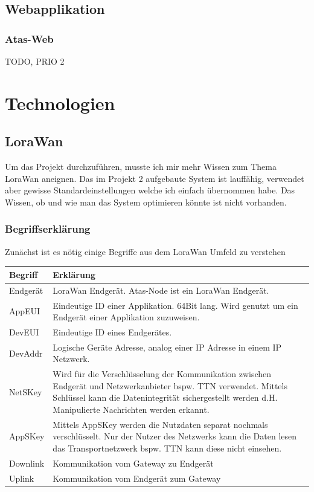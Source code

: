 \documentclass[11pt,english,german]{report}
\theoremstyle{definition}
\begin{document}
\newpage
\section{Webapplikation}
\subsection{Atas-Web}
TODO, PRIO 2

\chapter{Technologien}
\section{LoraWan}
Um das Projekt durchzuführen, musste ich mir mehr Wissen zum Thema LoraWan aneignen. Das im Projekt 2 aufgebaute System ist lauffähig, verwendet aber gewisse Standardeinstellungen welche ich einfach übernommen habe. Das Wissen, ob und wie man das System optimieren könnte ist nicht vorhanden.
\subsection{Begriffserklärung}
Zunächst ist es nötig einige Begriffe aus dem LoraWan Umfeld zu verstehen\\[0.5cm]
\begin{tabularx}{\textwidth}{ l|X }
	\textbf{Begriff} & \textbf{Erklärung} \\ \hline
	Endgerät & LoraWan Endgerät. Atas-Node ist ein LoraWan Endgerät.\\ \hline
	AppEUI& Eindeutige ID einer Applikation. 64Bit lang. Wird genutzt um ein Endgerät einer Applikation zuzuweisen.\\ \hline
	DevEUI& Eindeutige ID eines Endgerätes. \\ \hline
	DevAddr & Logische Geräte Adresse, analog einer IP Adresse in einem IP Netzwerk.\\ \hline
	NetSKey & Wird für die Verschlüsselung der Kommunikation zwischen Endgerät und Netzwerkanbieter bspw. TTN verwendet. Mittels Schlüssel kann die Datenintegrität sichergestellt werden d.H. Manipulierte Nachrichten werden erkannt.\\ \hline
	AppSKey & Mittels AppSKey werden die Nutzdaten separat nochmals verschlüsselt. Nur der Nutzer des Netzwerks kann die Daten lesen das Transportnetzwerk bspw. TTN kann diese nicht einsehen.\cite{ttnsecurity}\\ \hline
	Downlink & Kommunikation vom Gateway zu Endgerät\\ \hline
	Uplink & Kommunikation vom Endgerät zum Gateway
\end{tabularx}
\end{document}
